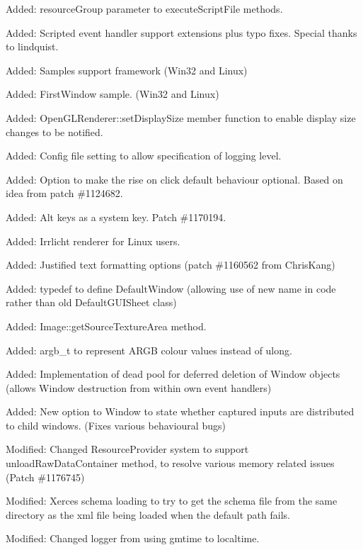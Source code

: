 \begin{DoxyItemize}
\item Added\+: resource\+Group parameter to execute\+Script\+File methods.
\item Added\+: Scripted event handler support extensions plus typo fixes. Special thanks to lindquist.
\item Added\+: Samples support framework (Win32 and Linux)
\item Added\+: \textquotesingle{}First\+Window\textquotesingle{} sample. (Win32 and Linux)
\item Added\+: Open\+G\+L\+Renderer\+::set\+Display\+Size member function to enable display size changes to be notified.
\item Added\+: Config file setting to allow specification of logging level.
\item Added\+: Option to make the \textquotesingle{}rise on click\textquotesingle{} default behaviour optional. Based on idea from patch \#1124682.
\item Added\+: Alt keys as a system key. Patch \#1170194.
\item Added\+: Irrlicht renderer for Linux users.
\item Added\+: Justified text formatting options (patch \#1160562 from Chris\+Kang)
\item Added\+: typedef to define Default\+Window (allowing use of new name in code rather than old Default\+G\+U\+I\+Sheet class)
\item Added\+: Image\+::get\+Source\+Texture\+Area method.
\item Added\+: argb\+\_\+t to represent A\+R\+GB colour values instead of ulong.
\item Added\+: Implementation of \textquotesingle{}dead pool\textquotesingle{} for deferred deletion of Window objects (allows Window destruction from within own event handlers)
\item Added\+: New option to Window to state whether \textquotesingle{}captured\textquotesingle{} inputs are distributed to child windows. (Fixes various behavioural bugs)
\item Modified\+: Changed Resource\+Provider system to support \textquotesingle{}unload\+Raw\+Data\+Container\textquotesingle{} method, to resolve various memory related issues (Patch \#1176745)
\item Modified\+: Xerces schema loading to try to get the schema file from the same directory as the xml file being loaded when the default path fails.
\item Modified\+: Changed logger from using gmtime to localtime.

\end{DoxyItemize}
